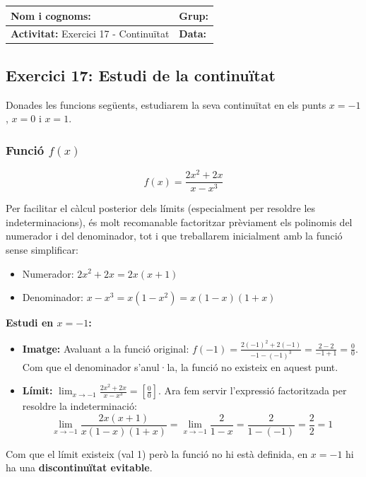 \documentclass[12pt,a4paper]{article}
\begin{document}
\begingroup
\renewcommand{\arraystretch}{2.2}
\begin{tabularx}{\textwidth}{|X|p{4cm}|}
    \hline
    \textbf{Nom i cognoms:} & \textbf{Grup:} \\ \hline
    \textbf{Activitat:} Exercici 17 - Continuïtat & \textbf{Data:} \\ \hline
\end{tabularx}
\endgroup

\vspace{0.5cm}

\subsection*{Exercici 17: Estudi de la continuïtat}

Donades les funcions següents, estudiarem la seva continuïtat en els punts $x = -1$, $x = 0$ i $x = 1$.

\subsubsection*{Funció $f(x)$}
\[ f(x) = \frac{2x^2 + 2x}{x - x^3} \]

Per facilitar el càlcul posterior dels límits (especialment per resoldre les indeterminacions), és molt recomanable factoritzar prèviament els polinomis del numerador i del denominador, tot i que treballarem inicialment amb la funció sense simplificar:
\begin{itemize}
    \item Numerador: $2x^2 + 2x = 2x(x + 1)$
    \item Denominador: $x - x^3 = x(1 - x^2) = x(1 - x)(1 + x)$
\end{itemize}

\textbf{Estudi en $x = -1$:}
\begin{itemize}
    \item \textbf{Imatge:} Avaluant a la funció original: $f(-1) = \frac{2(-1)^2 + 2(-1)}{-1 - (-1)^3} = \frac{2 - 2}{-1 + 1} = \frac{0}{0}$. Com que el denominador s'anul·la, la funció no existeix en aquest punt.
    \item \textbf{Límit:} $\lim_{x \to -1} \frac{2x^2 + 2x}{x - x^3} = \left[\frac{0}{0}\right]$. Ara fem servir l'expressió factoritzada per resoldre la indeterminació:
    \[ \lim_{x \to -1} \frac{2x(x + 1)}{x(1 - x)(1 + x)} = \lim_{x \to -1} \frac{2}{1 - x} = \frac{2}{1 - (-1)} = \frac{2}{2} = 1 \]
\end{itemize}
Com que el límit existeix (val 1) però la funció no hi està definida, en $x = -1$ hi ha una \textbf{discontinuïtat evitable}.
\end{document}
